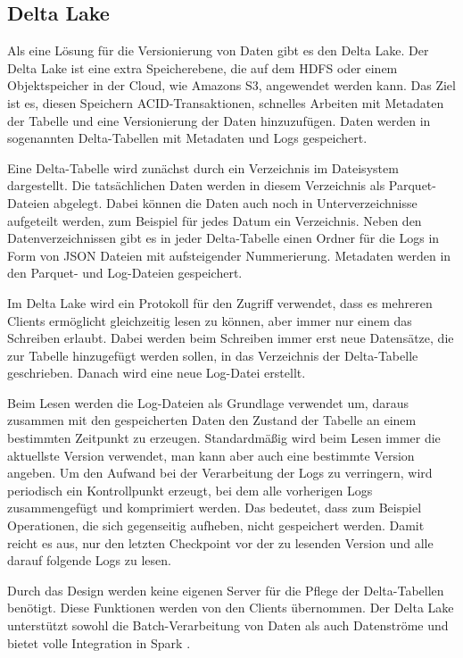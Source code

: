 \subsection{Delta Lake}

Als eine Lösung für die Versionierung von Daten gibt es den Delta Lake.
Der Delta Lake ist eine extra Speicherebene, die auf dem HDFS oder einem Objektspeicher in der Cloud, wie Amazons S3, angewendet werden kann.
Das Ziel ist es, diesen Speichern ACID-Transaktionen, schnelles Arbeiten mit Metadaten der Tabelle und eine Versionierung der Daten hinzuzufügen.
Daten werden in sogenannten Delta-Tabellen mit Metadaten und Logs gespeichert.

Eine Delta-Tabelle wird zunächst durch ein Verzeichnis im Dateisystem dargestellt.
Die tatsächlichen Daten werden in diesem Verzeichnis als Parquet-Dateien abgelegt.
Dabei können die Daten auch noch in Unterverzeichnisse aufgeteilt werden, zum Beispiel für jedes Datum ein Verzeichnis.
Neben den Datenverzeichnissen gibt es in jeder Delta-Tabelle einen Ordner für die Logs in Form von JSON Dateien mit aufsteigender Nummerierung.
Metadaten werden in den Parquet- und Log-Dateien gespeichert.

Im Delta Lake wird ein Protokoll für den Zugriff verwendet, dass es mehreren Clients ermöglicht gleichzeitig lesen zu können, aber immer nur einem das Schreiben erlaubt.
Dabei werden beim Schreiben immer erst neue Datensätze, die zur Tabelle hinzugefügt werden sollen, in das Verzeichnis der Delta-Tabelle geschrieben.
Danach wird eine neue Log-Datei erstellt.

Beim Lesen werden die Log-Dateien als Grundlage verwendet um, daraus zusammen mit den gespeicherten Daten den Zustand der Tabelle an einem bestimmten Zeitpunkt zu erzeugen.
Standardmäßig wird beim Lesen immer die aktuellste Version verwendet, man kann aber auch eine bestimmte Version angeben.
Um den Aufwand bei der Verarbeitung der Logs zu verringern, wird periodisch ein Kontrollpunkt erzeugt, bei dem alle vorherigen Logs zusammengefügt und komprimiert werden.
Das bedeutet, dass zum Beispiel Operationen, die sich gegenseitig aufheben, nicht gespeichert werden.
Damit reicht es aus, nur den letzten Checkpoint vor der zu lesenden Version und alle darauf folgende Logs zu lesen.

Durch das Design werden keine eigenen Server für die Pflege der Delta-Tabellen benötigt.
Diese Funktionen werden von den Clients übernommen.
Der Delta Lake unterstützt sowohl die Batch-Verarbeitung von Daten als auch Datenströme und bietet volle Integration in Spark \parencite{deltalake}.

